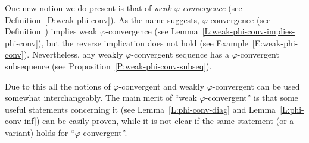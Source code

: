 \documentclass[main.tex]{subfiles}
\begin{document}
One new notion we do present is that of
\emph{weak $\varphi$-convergence}
(see Definition~\ref{D:weak-phi-conv}).
As the name suggests,
$\varphi$-convergence (see Definition~)
implies weak $\varphi$-convergence
(see Lemma~\ref{L:weak-phi-conv-implies-phi-conv}),
but the reverse implication does not hold
(see Example~\ref{E:weak-phi-conv}).
Nevertheless,
any weakly $\varphi$-convergent sequence
has a $\varphi$-convergent subsequence
(see Proposition~\ref{P:weak-phi-conv-subseq}).

Due to this all 
the notions of $\varphi$-convergent
and weakly $\varphi$-convergent
can be used somewhat interchangeably.
The main merit of ``weak $\varphi$-convergent''
is that some useful statements concerning it
(see Lemma~\ref{L:phi-conv-diag} and  Lemma~\ref{L:phi-conv-inf}) 
can be easily proven,
while it is not clear if the same statement (or a variant) holds for
``$\varphi$-convergent''.
\end{document}
